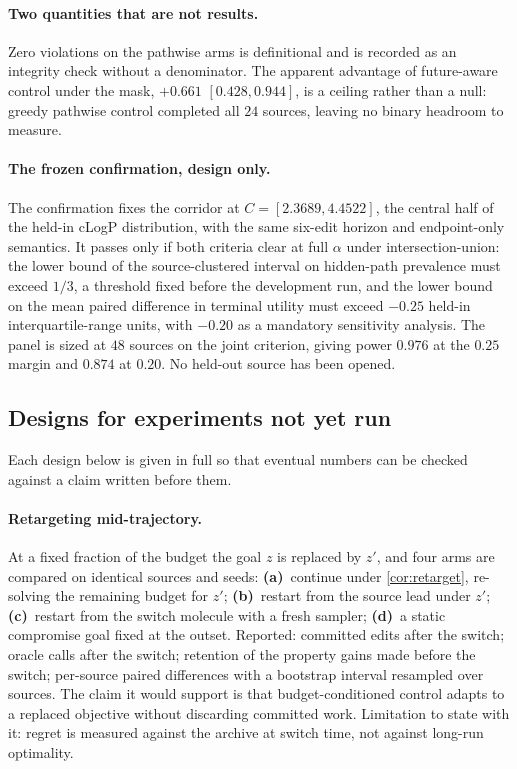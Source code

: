 \paragraph{Two quantities that are not results.}
Zero violations on the pathwise arms is definitional and is recorded as an integrity check without a denominator. The apparent advantage of future-aware control under the mask, $+0.661$ $[0.428,0.944]$, is a ceiling rather than a null: greedy pathwise control completed all $24$ sources, leaving no binary headroom to measure.

\paragraph{The frozen confirmation, design only.}
The confirmation fixes the corridor at $C=[2.3689,4.4522]$, the central half of the held-in cLogP distribution, with the same six-edit horizon and endpoint-only semantics. It passes only if both criteria clear at full $\alpha$ under intersection-union: the lower bound of the source-clustered interval on hidden-path prevalence must exceed $1/3$, a threshold fixed before the development run, and the lower bound on the mean paired difference in terminal utility must exceed $-0.25$ held-in interquartile-range units, with $-0.20$ as a mandatory sensitivity analysis. The panel is sized at $48$ sources on the joint criterion, giving power $0.976$ at the $0.25$ margin and $0.874$ at $0.20$. No held-out source has been opened.

\subsection{Designs for experiments not yet run}
\label{app:capdesign}

Each design below is given in full so that eventual numbers can be checked against a claim written before them.

\paragraph{Retargeting mid-trajectory.}
At a fixed fraction of the budget the goal $z$ is replaced by $z'$, and four arms are compared on identical sources and seeds: \textbf{(a)}~continue under \cref{cor:retarget}, re-solving the remaining budget for $z'$; \textbf{(b)}~restart from the source lead under $z'$; \textbf{(c)}~restart from the switch molecule with a fresh sampler; \textbf{(d)}~a static compromise goal fixed at the outset.
Reported: committed edits after the switch; oracle calls after the switch; retention of the property gains made before the switch; per-source paired differences with a bootstrap interval resampled over sources.
The claim it would support is that budget-conditioned control adapts to a replaced objective without discarding committed work.
Limitation to state with it: regret is measured against the archive at switch time, not against long-run optimality.

